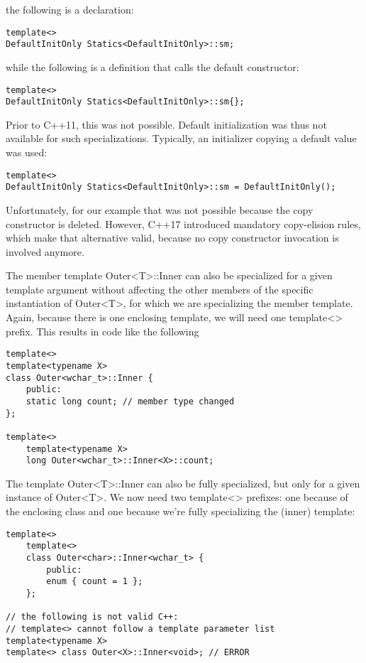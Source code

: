 the following is a declaration:

\begin{lstlisting}[style=styleCXX]
template<>
DefaultInitOnly Statics<DefaultInitOnly>::sm;
\end{lstlisting}

while the following is a definition that calls the default constructor:

\begin{lstlisting}[style=styleCXX]
template<>
DefaultInitOnly Statics<DefaultInitOnly>::sm{};
\end{lstlisting}

Prior to C++11, this was not possible. Default initialization was thus not available for such specializations. Typically, an initializer copying a default value was used:

\begin{lstlisting}[style=styleCXX]
template<>
DefaultInitOnly Statics<DefaultInitOnly>::sm = DefaultInitOnly();
\end{lstlisting}

Unfortunately, for our example that was not possible because the copy constructor is deleted. However, C++17 introduced mandatory copy-elision rules, which make that alternative valid, because no copy constructor invocation is involved anymore.

The member template Outer<T>::Inner can also be specialized for a given template argument without affecting the other members of the specific instantiation of Outer<T>, for which we are specializing the member template. Again, because there is one enclosing template, we will need one template<> prefix. This results in code like the following

\begin{lstlisting}[style=styleCXX]
template<>
template<typename X>
class Outer<wchar_t>::Inner {
	public:
	static long count; // member type changed
};

template<>
	template<typename X>
	long Outer<wchar_t>::Inner<X>::count;
\end{lstlisting}

The template Outer<T>::Inner can also be fully specialized, but only for a given instance of Outer<T>. We now need two template<> prefixes: one because of the enclosing class and one because we’re fully specializing the (inner) template:

\begin{lstlisting}[style=styleCXX]
template<>
	template<>
	class Outer<char>::Inner<wchar_t> {
		public:
		enum { count = 1 };
	};

// the following is not valid C++:
// template<> cannot follow a template parameter list
template<typename X>
template<> class Outer<X>::Inner<void>; // ERROR
\end{lstlisting}

